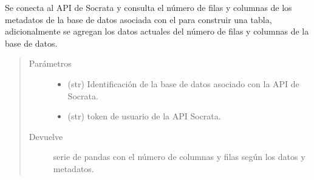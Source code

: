 \documentclass[letterpaper,10pt,openany,spanish]{sphinxmanual}
\begin{document}

\begin{fulllineitems}
\label{\detokenize{metadatos:metadatos.comparar_tamano}}
Se conecta al API de Socrata y consulta el número de filas y columnas de los metadatos de la base de datos asociada con el  para construir una tabla, adicionalmente se agregan los datos actuales del número de filas y columnas de la base de datos.
\begin{quote}\begin{description}
\item[{Parámetros}] \leavevmode\begin{itemize}
\item {} 
 \textendash{} (str) Identificación de la base de datos asociado con la API de Socrata.

\item {} 
 \textendash{} (str)  \sphinxhyphen{} token de usuario de la API Socrata.

\end{itemize}

\item[{Devuelve}] \leavevmode
serie de pandas con el número de columnas y filas según los datos y metadatos.

\end{description}\end{quote}

\end{fulllineitems}

\end{document}
